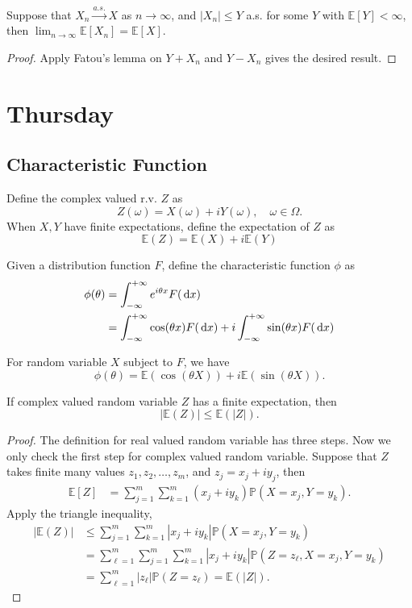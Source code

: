 \begin{theorem}
Suppose that $X_n\xrightarrow{a.s.}X$ as $n\to\infty$, and $|X_n|\le Y$ a.s. for some $Y$ with $\mathbb{E}[Y]<\infty$, then $\lim_{n\to\infty}\mathbb{E}[X_n] = \mathbb{E}[X].$
\end{theorem}
\begin{proof}
Apply Fatou's lemma on $Y+X_n$ and $Y-X_n$ gives the desired result.
\end{proof}
\clearpage
\section{Thursday}

\subsection{Characteristic Function}
Define the complex valued r.v. $Z$ as
\[
Z(\omega) = X(\omega) +iY(\omega),\quad\omega\in\Omega.
\]
When $X,Y$ have finite expectations, define the expectation of $Z$ as
\[
\mathbb{E}(Z)=\mathbb{E}(X)+i\mathbb{E}(Y)
\] 

\begin{definition}
Given a distribution function $F$, define the characteristic function $\phi$ as
\begin{align*}
\phi(\theta)&=\int_{-\infty}^{+\infty}e^{i\theta x}F(\,\mathrm{d} x)\\
&=\int_{-\infty}^{+\infty}\cos(\theta x)F(\,\mathrm{d} x) + i\int_{-\infty}^{+\infty}\sin(\theta x)F(\,\mathrm{d} x) 
\end{align*}
\end{definition}

For random variable $X$ subject to $F$, we have 
\[
\phi(\theta) = \mathbb{E}(\cos(\theta X))+i\mathbb{E}(\sin(\theta X)).
\]

\begin{proposition}
If complex valued random variable $Z$ has a finite expectation, then 
\[
|\mathbb{E}(Z)|\le \mathbb{E}(|Z|).
\]
\end{proposition}

\begin{proof}
The definition for real valued random variable has three steps.
Now we only check the first step for complex valued random variable.
Suppose that $Z$ takes finite many values $z_1,z_2,\ldots,z_m$, and $z_j = x_j + iy_j$, then
\begin{align*}
\mathbb{E}[Z]&=\sum_{j=1}^m\sum_{k=1}^m(x_j + iy_k)\mathbb{P}(X=x_j,Y=y_k).
\end{align*}
Apply the triangle inequality,
\begin{align*}
|\mathbb{E}(Z)|&\le \sum_{j=1}^m\sum_{k=1}^m|x_j + iy_k|\mathbb{P}(X=x_j,Y=y_k)\\
&=\sum_{\ell=1}^m\sum_{j=1}^m\sum_{k=1}^m|x_j + iy_k|\mathbb{P}(Z=z_\ell,X=x_j,Y=y_k)\\
&=\sum_{\ell=1}^m|z_\ell|\mathbb{P}(Z=z_\ell)=\mathbb{E}(|Z|).
\end{align*}

\end{proof}

